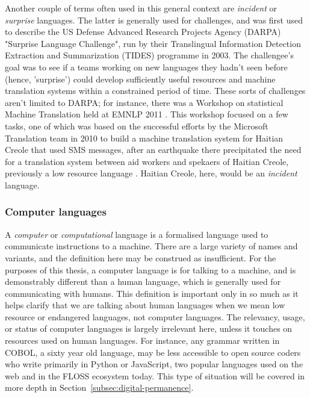Another couple of terms often used in this general context are \textit{incident} or \textit{surprise} languages. The latter is generally used for challenges, and was first used to describe the US Defense Advanced Research Projects Agency (DARPA) "Surprise Language Challenge", run by their Translingual Information Detection Extraction and Summarization (TIDES) programme in 2003. The challengee's goal was to see if a teams working on new languages they hadn't seen before (hence, 'surprise') could develop sufficiently useful resources and machine translation systems within a constrained period of time. \citep{oard2003surprise} These sorts of challenges aren't limited to DARPA; for instance, there was a Workshop on statistical Machine Translation held at EMNLP 2011 \citep{callison2011findings}. This workshop focused on a few tasks, one of which was based on the successful efforts by the Microsoft Translation team in 2010 to build a machine translation system for Haitian Creole that used SMS messages, after an earthquake there precipitated the need for a translation system between aid workers and spekaers of Haitian Creole, previously a low resource language \citep{lewis2010haitian, lewis2011crisis}. Haitian Creole, here, would be an \textit{incident} language.

\subsubsection{Computer languages}

A \textit{computer} or \textit{computational} language is a formalised language used to communicate instructions to a machine. There are a large variety of names and variants, and the definition here may be construed as insufficient. For the purposes of this thesis, a computer language is for talking to a machine, and is demonstrably different than a human language, which is generally used for communicating with humans. This definition is important only in so much as it helps clarify that we are talking about human languages when we mean low resource or endangered languages, not computer languages. The relevancy, usage, or status of computer languages is largely irrelevant here, unless it touches on resources used on human languages. For instance, any grammar written in COBOL, a sixty year old language, may be less accessible to open source coders who write primarily in Python or JavaScript, two popular languages used on the web and in the FLOSS ecosystem today. This type of situation will be covered in more depth in Section~\ref{subsec:digital-permanence}.

